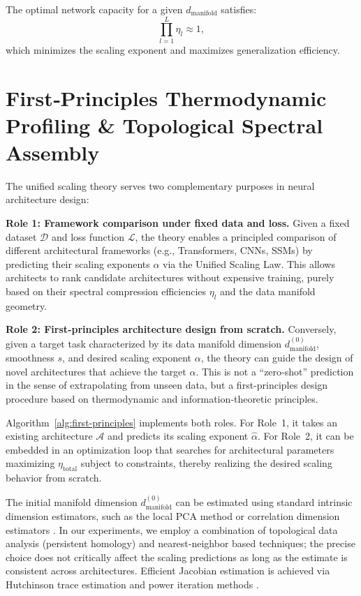 \documentclass[11pt, a4paper]{article}
\theoremstyle{definition}
\begin{document}
\begin{coro}
The optimal network capacity for a given $d_{\text{manifold}}$ satisfies:
\begin{equation}
\prod_{l=1}^{L}\eta_l \approx 1,
\end{equation}
which minimizes the scaling exponent and maximizes generalization efficiency.
\end{coro}

\section{First‑Principles Thermodynamic Profiling \& Topological Spectral Assembly}
\label{sec:first-principles-tsa}

The unified scaling theory serves two complementary purposes in neural architecture design:

\textbf{Role 1: Framework comparison under fixed data and loss.} Given a fixed dataset $\mathcal{D}$ and loss function $\mathcal{L}$, the theory enables a principled comparison of different architectural frameworks (e.g., Transformers, CNNs, SSMs) by predicting their scaling exponents $\alpha$ via the Unified Scaling Law. This allows architects to rank candidate architectures without expensive training, purely based on their spectral compression efficiencies $\eta_l$ and the data manifold geometry.

\textbf{Role 2: First‑principles architecture design from scratch.} Conversely, given a target task characterized by its data manifold dimension $d_{\text{manifold}}^{(0)}$, smoothness $s$, and desired scaling exponent $\alpha$, the theory can guide the design of novel architectures that achieve the target $\alpha$. This is not a ``zero‑shot'' prediction in the sense of extrapolating from unseen data, but a first‑principles design procedure based on thermodynamic and information‑theoretic principles.

Algorithm~\ref{alg:first-principles} implements both roles. For Role~1, it takes an existing architecture $\mathcal{A}$ and predicts its scaling exponent $\hat{\alpha}$. For Role~2, it can be embedded in an optimization loop that searches for architectural parameters maximizing $\eta_{\text{total}}$ subject to constraints, thereby realizing the desired scaling behavior from scratch.

The initial manifold dimension $d_{\text{manifold}}^{(0)}$ can be estimated using standard intrinsic dimension estimators, such as the local PCA method \cite{levina2005maximum} or correlation dimension estimators \cite{grassberger1983measuring}. In our experiments, we employ a combination of topological data analysis (persistent homology) and nearest-neighbor based techniques; the precise choice does not critically affect the scaling predictions as long as the estimate is consistent across architectures. Efficient Jacobian estimation is achieved via Hutchinson trace estimation \cite{hutchinson1990stochastic} and power iteration methods \cite{golub2013matrix}.
\end{document}
